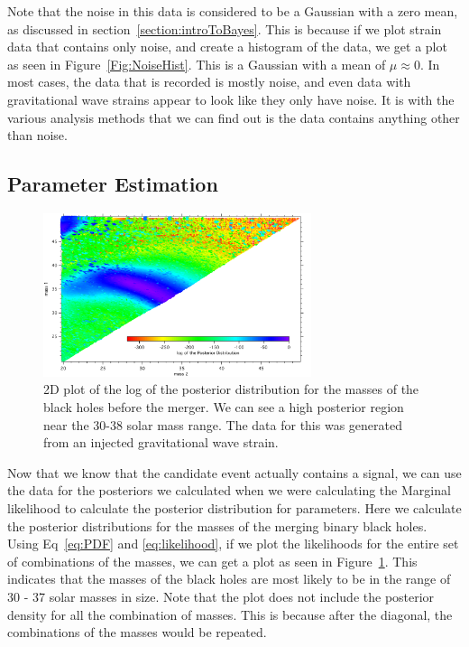 \documentclass{article}
\begin{document}
 
 Note that the noise in this data is considered to be a Gaussian with a zero mean, as discussed in section~\ref{section:introToBayes}. This is because if we plot strain data that contains only noise, and create a histogram of the data, we get a plot as seen in Figure~\ref{Fig:NoiseHist}. This is a Gaussian with a mean of $\mu \approx 0$. In most cases, the data that is recorded is mostly noise, and even data with gravitational wave strains appear to look like they only have noise. It is with the various analysis methods that we can find out is the data contains anything other than noise.\\
  
 
 
 \subsection{Parameter Estimation}
 
     \begin{figure}[h]
     	\centering
     	\includegraphics[width=0.7\textwidth]{Figures/m1m2.pdf} 
     	\caption{2D plot of the log of the posterior distribution for the masses of the black holes before the merger. We can see a high posterior region near the 30-38 solar mass range. The data for this was generated from an injected gravitational wave strain.}
     	\label{Fig:2Dmasses}
     \end{figure}
 
 Now that we know that the candidate event actually contains a signal, we can use the data for the posteriors we calculated when we were calculating the Marginal likelihood to calculate the posterior distribution for parameters. Here we calculate the posterior distributions for the masses of the merging binary black holes. Using Eq~\ref{eq:PDF} and \ref{eq:likelihood}, if we plot the likelihoods for the entire set of combinations of the masses, we can get a plot as seen in Figure~\ref{Fig:2Dmasses}. This indicates that the masses of the black holes are most likely to be in the range of 30 - 37 solar masses in size. Note that the plot does not include the posterior density for all the combination of masses. This is because after the diagonal, the combinations of the masses would be repeated. \\
 
\end{document}
